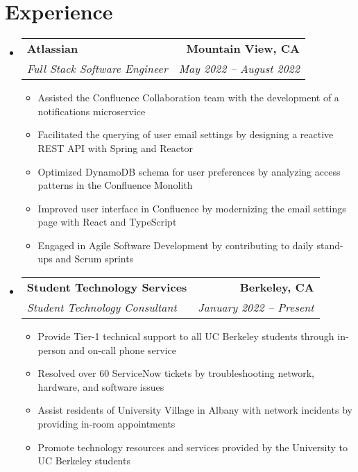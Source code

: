 \documentclass[letterpaper,11pt]{article}
\makeatletter
\newcommand{\resumeItem}[1]{
  \item\small{
    {#1 \vspace{-2pt}}
  }
}
\newcommand{\resumeSubheading}[4]{
  \vspace{-2pt}\item
    \begin{tabular*}{0.97\textwidth}[t]{l@{\extracolsep{\fill}}r}
      \textbf{#1} & #2 \\
      \textit{\small#3} & \textit{\small #4} \\
    \end{tabular*}\vspace{-7pt}
}
\newcommand{\resumeSubSubheading}[2]{
    \item
    \begin{tabular*}{0.97\textwidth}{l@{\extracolsep{\fill}}r}
      \textit{\small#1} & \textit{\small #2} \\
    \end{tabular*}\vspace{-7pt}
}
\newcommand{\resumeSubHeadingListStart}{\begin{itemize}[leftmargin=0.15in, label={}]}
\newcommand{\resumeSubHeadingListEnd}{\end{itemize}}
\newcommand{\resumeItemListStart}{\begin{itemize}}
\newcommand{\resumeItemListEnd}{\end{itemize}\vspace{-5pt}}
\makeatother
\begin{document}
\section{\textbf{Experience}}
  \resumeSubHeadingListStart

    \resumeSubheading
      {Atlassian}{\textbf{Mountain View, CA}}
      {Full Stack Software Engineer}{May 2022 -- August 2022}
      \resumeItemListStart
        \resumeItem{Assisted the Confluence Collaboration team with the development of a notifications microservice}
        \resumeItem{Facilitated the querying of user email settings by designing a reactive REST API with Spring and Reactor}
        \resumeItem{Optimized DynamoDB schema for user preferences by analyzing access patterns in the Confluence Monolith}
        \resumeItem{Improved user interface in Confluence by modernizing the email settings page with React and TypeScript}
        \resumeItem{Engaged in Agile Software Development by contributing to daily stand-ups and Scrum sprints}
      \resumeItemListEnd
      

    \resumeSubheading
      {Student Technology Services}{\textbf{Berkeley, CA}}
      {Student Technology Consultant}{January 2022 -- Present}
      \resumeItemListStart
        \resumeItem{Provide Tier-1 technical support to all UC Berkeley students through in-person and on-call phone service}
        \resumeItem{Resolved over 60 ServiceNow tickets by troubleshooting network, hardware, and software issues}
        \resumeItem{Assist residents of University Village in Albany with network incidents by providing in-room appointments}
        \resumeItem{Promote technology resources and services provided by the University to UC Berkeley students}
    \resumeItemListEnd

  \resumeSubHeadingListEnd


\end{document}
